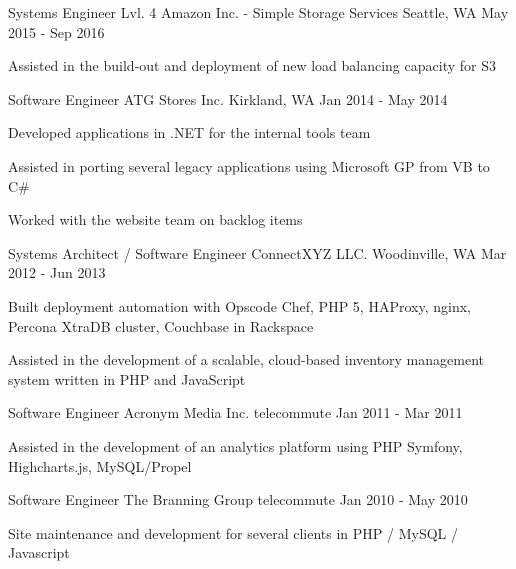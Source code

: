 
    \begin{cventries}
    
    \cventry
    {Systems Engineer Lvl. 4}
    {Amazon Inc. - Simple Storage Services}
    {Seattle, WA}
    {May 2015 - Sep 2016}
    {
        \begin{cvitems}
        \item {Assisted in the build-out and deployment of new load balancing capacity for S3}
        \end{cvitems}
    }

    \cventry
    {Software Engineer}
    {ATG Stores Inc.}
    {Kirkland, WA}
    {Jan 2014 - May 2014}
    {
        \begin{cvitems}
        \item {Developed applications in .NET for the internal tools team}
        \item {Assisted in porting several legacy applications using Microsoft GP from VB to C\#}
        \item {Worked with the website team on backlog items}
        \end{cvitems}
    }

    \cventry
    {Systems Architect / Software Engineer}
    {ConnectXYZ LLC.}
    {Woodinville, WA}
    {Mar 2012 - Jun 2013}
    {
        \begin{cvitems}
        \item {Built deployment automation with Opscode Chef, PHP 5, HAProxy, nginx, Percona XtraDB cluster, Couchbase in Rackspace}
        \item {Assisted in the development of a scalable, cloud-based inventory management system written in PHP and JavaScript}
        \end{cvitems}
    }

    \cventry
    {Software Engineer}
    {Acronym Media Inc.}
    {telecommute}
    {Jan 2011 - Mar 2011}
    {
        \begin{cvitems}
        \item {Assisted in the development of an analytics platform using PHP Symfony, Highcharts.js, MySQL/Propel}
        \end{cvitems}
    }

    \cventry
    {Software Engineer}
    {The Branning Group}
    {telecommute}
    {Jan 2010 - May 2010}
    {
        \begin{cvitems}
        \item {Site maintenance and development for several clients in PHP / MySQL / Javascript}
        \end{cvitems}
    }


\end{cventries}
